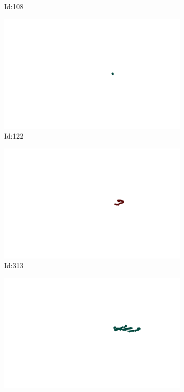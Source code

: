 \documentclass[12pt,twoside]{report}
\begin{document}
\begin{figure}
\begin{subfigure}[b]{0.20\textwidth}
\caption{Id:108}
\end{subfigure}
\begin{subfigure}[b]{0.20\textwidth}
\centering
\includegraphics[width=\textwidth]{../../trajectories/122.png}
\caption{Id:122}
\end{subfigure}
\begin{subfigure}[b]{0.20\textwidth}
\centering
\includegraphics[width=\textwidth]{../../trajectories/313.png}
\caption{Id:313}
\end{subfigure}
\begin{subfigure}[b]{0.20\textwidth}
\centering
\includegraphics[width=\textwidth]{../../trajectories/325.png}

\end{subfigure}
\end{figure}
\end{document}
